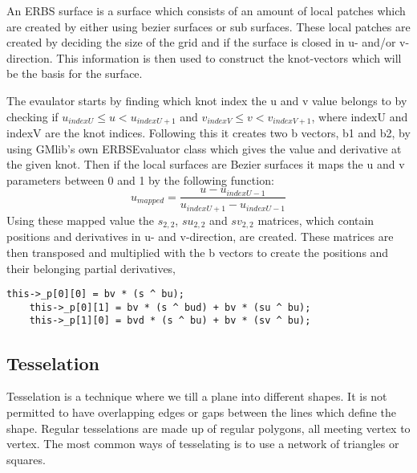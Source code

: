 \documentclass[a4paper,11pt]{article}
\begin{document}
An ERBS surface is a surface which consists of an amount of local patches which are created by either using bezier surfaces or sub surfaces. These local patches are created by deciding the size of the grid and if the surface is closed in u- and/or v-direction. This information is then used to construct the knot-vectors which will be the basis for the surface.

The evaulator starts by finding which knot index the u and v value belongs to by checking if \begin{math}u_{indexU}\leq u < u_{indexU+1}\end{math} and \begin{math}v_{indexV}\leq v < v_{indexV+1}\end{math}, where indexU and indexV are the knot indices. Following this it creates two b vectors, b1 and b2, by using GMlib's own ERBSEvaluator class which gives the value and derivative at the given knot. 
Then if the local surfaces are Bezier surfaces it maps the u and v parameters between 0 and 1 by the following function:
\begin{equation}
 u_{mapped} = \frac{u-u_{indexU-1}}{u_{indexU+1}-u_{indexU-1}}
\end{equation}
Using these mapped value the \begin{math}s_{2,2}\end{math}, \begin{math}su_{2,2}\end{math} and \begin{math}sv_{2,2}\end{math} matrices, which contain positions and derivatives in u- and v-direction, are created. These matrices are then transposed and multiplied with the b vectors to create the positions and their belonging partial derivatives,
\begin{lstlisting}[frame=single, caption={Assigning the p matrix}] 
    this->_p[0][0] = bv * (s ^ bu);
    this->_p[0][1] = bv * (s ^ bud) + bv * (su ^ bu);
    this->_p[1][0] = bvd * (s ^ bu) + bv * (sv ^ bu);
\end{lstlisting}

\subsection{Tesselation}
Tesselation is a technique where we till a plane into different shapes. It is not permitted to have overlapping edges or gaps between the lines which define the shape. Regular tesselations are made up of regular polygons, all meeting vertex to vertex. 
The most common ways of tesselating is to use a network of triangles or squares.
\end{document}
